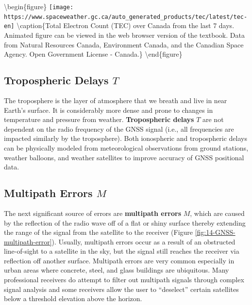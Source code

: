 \documentclass[
]{book}
\begin{document}
\textbackslash begin\{figure\}
\texttt{[image: https://www.spaceweather.gc.ca/auto\_generated\_products/tec/latest/tec-en]} \textbackslash caption\{Total Electron Count (TEC) over Canada from the last 7 days. Animated figure can be viewed in the web browser version of the textbook. Data from Natural Resources Canada, Environment Canada, and the Canadian Space Agency. Open Government License - Canada.\}\label{fig:14-total-electron-count-canada}
\textbackslash end\{figure\}

\subsection{\texorpdfstring{Tropospheric Delays \(T\)}{Tropospheric Delays T}}\label{tropospheric-delays-t}

The troposphere is the layer of atmosphere that we breath and live in near Earth's surface. It is considerably more dense and prone to changes in temperature and pressure from weather. \textbf{Tropospheric delays} \(T\) are not dependent on the radio frequency of the GNSS signal (i.e., all frequencies are impacted similarly by the troposphere). Both ionospheric and tropospheric delays can be physically modeled from meteorological observations from ground stations, weather balloons, and weather satellites to improve accuracy of GNSS positional data.

\subsection{\texorpdfstring{Multipath Errors \(M\)}{Multipath Errors M}}\label{multipath-errors-m}

The next significant source of errors are \textbf{multipath errors} \(M\), which are caused by the reflection of the radio wave off of a flat or shiny surface thereby extending the range of the signal from the satellite to the receiver (Figure \ref{fig:14-GNSS-multipath-error}). Usually, multipath errors occur as a result of an obstructed line-of-sight to a satellite in the sky, but the signal still reaches the receiver via reflection off another surface. Multipath errors are very common especially in urban areas where concrete, steel, and glass buildings are ubiquitous. Many professional receivers do attempt to filter out multipath signals through complex signal analysis and some receivers allow the user to ``deselect'' certain satellites below a threshold elevation above the horizon.
\end{document}
